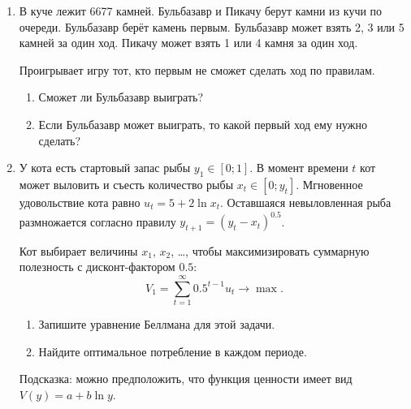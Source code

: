 \documentclass[12pt]{article}
\begin{document}
\begin{enumerate}
    \item 
        В куче лежит 6677 камней.
        Бульбазавр и Пикачу берут камни из кучи по очереди.
        Бульбазавр берёт камень первым.
        Бульбазавр может взять 2, 3 или 5 камней за один ход.
        Пикачу может взять 1 или 4 камня за один ход.
        
        Проигрывает игру тот, кто первым не сможет сделать ход по правилам.
        \begin{enumerate}
         \item Сможет ли Бульбазавр выиграть?
         \item Если Бульбазавр может выиграть, то какой первый ход ему нужно сделать?
        \end{enumerate}
    \item У кота есть стартовый запас рыбы $y_1 \in [0;1]$.
    В момент времени $t$ кот может выловить и съесть количество рыбы $x_t \in [0; y_t]$.
    Мгновенное удовольствие кота равно $u_t = 5 + 2\ln x_t$.
    Оставшаяся невыловленная рыба размножается согласно правилу $y_{t+1} = (y_t - x_t)^{0.5}$.

    Кот выбирает величины $x_1$, $x_2$, \ldots, чтобы максимизировать 
    суммарную полезность с дисконт-фактором $0.5$:
    \[
     V_1 = \sum_{t=1}^{\infty} 0.5^{t-1} u_t \to \max.
    \]

    \begin{enumerate}
        \item Запишите уравнение Беллмана для этой задачи. 
        \item Найдите оптимальное потребление в каждом периоде. 
    \end{enumerate}
    
 
 
    Подсказка: можно предположить, что функция ценности имеет вид $V(y) = a + b \ln y$.


\end{enumerate}


\newpage
\end{document}
